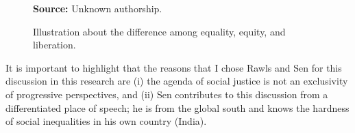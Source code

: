 \begin{figure}[ht!]
\centering

\caption{\textmd{Illustration about the difference among equality, equity, and liberation.}}
\label{fig:rliberation}

\par\medskip\ABNTEXfontereduzida\selectfont\textbf{Source:} Unknown authorship.
\end{figure}

It is important to highlight that the reasons that I chose Rawls and Sen for this discussion in this research are (i) the agenda of social justice is not an exclusivity of progressive perspectives, and (ii) Sen contributes to this discussion from a differentiated place of speech; he is from the global south and knows the hardness of social inequalities in his own country (India).
